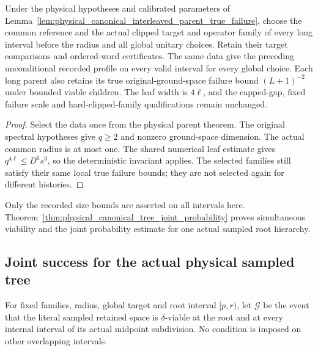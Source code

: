 \begin{lemma}
    \label{lem:physical_canonical_interval_sampling_data}
    \leanok
    Under the physical hypotheses and calibrated parameters of
    Lemma~\ref{lem:physical_canonical_interleaved_parent_true_failure},
    choose the common reference and the actual clipped target and operator
    family of every long interval before the radius and all global unitary
    choices. Retain their target comparisons and ordered-word certificates.
    The same data give the preceding unconditional recorded profile on
    every valid interval for every global choice. Each long parent also
    retains its true original-ground-space failure bound $(L+1)^{-2}$
    under bounded viable children.
    The leaf width is $4\ell$, and the capped-gap, fixed failure scale and
    hard-clipped-family qualifications remain unchanged.
\end{lemma}
\begin{proof}\leanok
    Select the data once from the physical parent theorem. The original
    spectral hypotheses give $q\ge2$ and nonzero ground-space dimension.
    The actual common radius is at most one. The shared numerical leaf
    estimate gives $q^{4\ell}\le D^6s^3$, so the deterministic invariant
    applies. The selected families still satisfy their same local true
    failure bounds; they are not selected again for different histories.
\end{proof}

Only the recorded size bounds are asserted on all intervals here.
Theorem~\ref{thm:physical_canonical_tree_joint_probability} proves
simultaneous viability and the joint probability estimate for one actual
sampled root hierarchy.

\subsection{Joint success for the actual physical sampled tree}

\begin{definition}
    \label{def:canonical_interval_sampling_tree_good}
    \leanok
    For fixed families, radius, global target and root interval $[p,r)$,
    let $\mathcal G$ be the event that the literal sampled retained space
    is $\delta$-viable at the root and at every internal interval of its
    actual midpoint subdivision. No condition is imposed on other
    overlapping intervals.
\end{definition}

